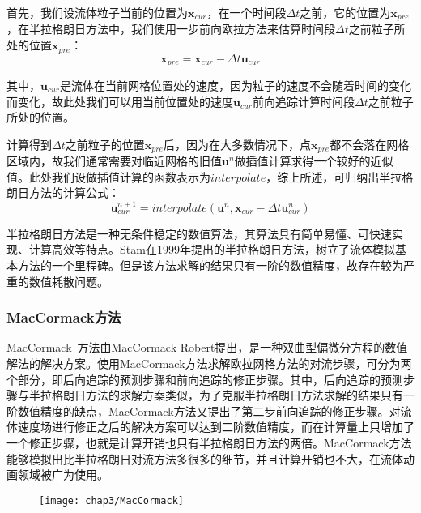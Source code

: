 首先，我们设流体粒子当前的位置为$\boldsymbol x_{cur}$，在一个时间段$\Delta t$之前，它的位置为$\boldsymbol x_{pre}$，在半拉格朗日方法中，我们使用一步前向欧拉方法来估算时间段$\Delta t$之前粒子所处的位置$\boldsymbol x_{pre}$：
\begin{equation}
\boldsymbol x_{pre} = \boldsymbol x_{cur} - \Delta t \boldsymbol u_{cur}
\end{equation}

其中，$\boldsymbol u_{cur}$是流体在当前网格位置处的速度，因为粒子的速度不会随着时间的变化而变化，故此处我们可以用当前位置处的速度$\boldsymbol u_{cur}$前向追踪计算时间段$\Delta t$之前粒子所处的位置。

计算得到$\Delta t$之前粒子的位置$\boldsymbol x_{pre}$后，因为在大多数情况下，点$\boldsymbol x_{pre}$都不会落在网格区域内，故我们通常需要对临近网格的旧值$\boldsymbol u^n$做插值计算求得一个较好的近似值。此处我们设做插值计算的函数表示为$interpolate$，综上所述，可归纳出半拉格朗日方法的计算公式：
\begin{equation}
\boldsymbol u_{cur}^{n + 1} = interpolate({\boldsymbol u}^n, \boldsymbol x_{cur}  - \Delta t \boldsymbol u_{cur}^n)
\end{equation}

半拉格朗日方法是一种无条件稳定的数值算法，其算法具有简单易懂、可快速实现、计算高效等特点。Stam在1999年提出的半拉格朗日方法，树立了流体模拟基本方法的一个里程碑。但是该方法求解的结果只有一阶的数值精度，故存在较为严重的数值耗散问题。

\subsubsection{MacCormack方法}

MacCormack~\cite{maccormack2003effect}方法由MacCormack Robert提出，是一种双曲型偏微分方程的数值解法的解决方案。使用MacCormack方法求解欧拉网格方法的对流步骤，可分为两个部分，即后向追踪的预测步骤和前向追踪的修正步骤。其中，后向追踪的预测步骤与半拉格朗日方法的求解方案类似，为了克服半拉格朗日方法求解的结果只有一阶数值精度的缺点，MacCormack方法又提出了第二步前向追踪的修正步骤。对流体速度场进行修正之后的解决方案可以达到二阶数值精度，而在计算量上只增加了一个修正步骤，也就是计算开销也只有半拉格朗日方法的两倍。MacCormack方法能够模拟出比半拉格朗日对流方法多很多的细节，并且计算开销也不大，在流体动画领域被广为使用。

\begin{figure}
  \centering
   \texttt{[image: chap3/MacCormack]}
\end{figure}

